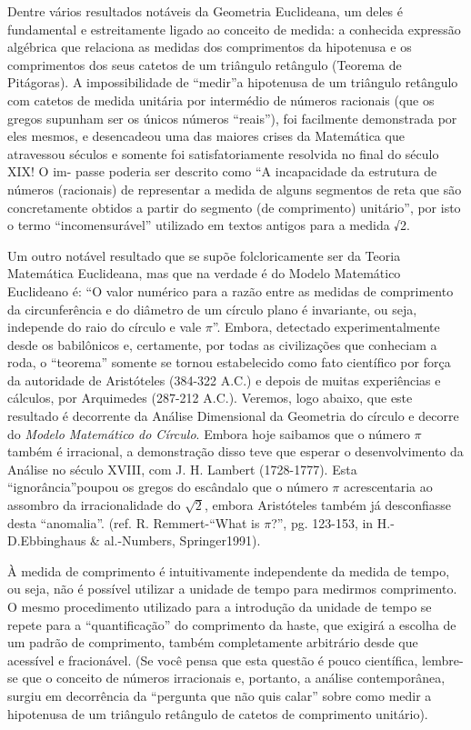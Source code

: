     Dentre vários resultados notáveis da Geometria Euclideana, um deles é fundamental e estreitamente ligado ao conceito de medida: a conhecida expressão algébrica que relaciona as medidas dos comprimentos da hipotenusa e os comprimentos dos seus catetos de um triângulo retângulo (Teorema de Pitágoras). A impossibilidade de “medir”a hipotenusa de um triângulo retângulo com catetos de medida unitária por intermédio de números racionais (que os gregos supunham ser os únicos números “reais”), foi facilmente demonstrada por eles mesmos, e desencadeou uma das maiores crises da Matemática que atravessou séculos e somente foi satisfatoriamente resolvida no final do século XIX! O im- passe poderia ser descrito como “A incapacidade da estrutura de números (racionais) de representar a medida de alguns segmentos de reta que são concretamente obtidos a partir do segmento (de comprimento) unitário”, por isto o termo ``incomensurável'' utilizado em textos antigos para a medida √2.

Um outro notável resultado que se supõe folcloricamente ser da Teoria Matemática Euclideana, mas que na verdade é do Modelo Matemático Euclideano é: ``O valor numérico para a razão entre as medidas de comprimento da circunferência e do diâmetro de um círculo plano é invariante, ou seja, independe do raio do círculo e vale \(\pi\)''. Embora, detectado experimentalmente desde os babilônicos e, certamente, por todas as civilizações que conheciam a roda, o ``teorema'' somente se tornou estabelecido como fato científico por força da autoridade de Aristóteles (384-322 A.C.) e depois de muitas experiências e cálculos, por Arquimedes (287-212 A.C.). Veremos, logo abaixo, que este resultado é decorrente da Análise Dimensional da Geometria do círculo e decorre do \textit{Modelo Matemático do Círculo}. Embora hoje saibamos que o número \(\pi\) também é irracional, a demonstração disso teve que esperar o desenvolvimento da Análise no século XVIII, com J. H. Lambert (1728-1777). Esta ``ignorância”poupou os gregos do escândalo que o número \(\pi\) acrescentaria ao assombro da irracionalidade do \(\sqrt{2}\), embora Aristóteles também já desconfiasse desta ``anomalia''. (ref. R. Remmert-``What is \(\pi\)?'', pg. 123-153, in H.-D.Ebbinghaus \& al.-Numbers, Springer1991).

À medida de comprimento é intuitivamente independente da medida de tempo, ou seja, não é possível utilizar a unidade de tempo para medirmos comprimento. O mesmo procedimento utilizado para a introdução da unidade de tempo se repete para a ``quantificação'' do comprimento da haste, que exigirá a escolha de um padrão de comprimento, também completamente arbitrário desde que acessível e fracionável. (Se você pensa que esta questão é pouco científica, lembre-se que o conceito de números irracionais e, portanto, a análise contemporânea, surgiu em decorrência da ``pergunta que não quis calar'' sobre como medir a hipotenusa de um triângulo retângulo de catetos de comprimento unitário).


